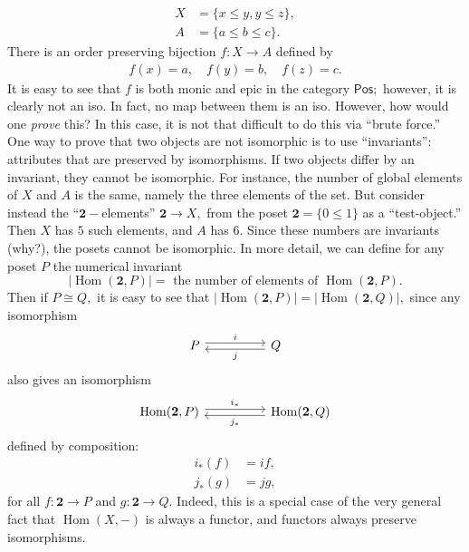 \documentclass[11pt,leqno,landscape,semhelv]{seminar}
\numberwithin{equation}{section}
\theoremstyle{definition}
\numberwithin{thm}{section}
\numberwithin{equation}{section}
\newcommand{\Hom}{\operatorname{Hom}}
\begin{document}
\begin{align*} 
	X &= \{x\le y, y\le z\},\\
	A &= \{a \le b \le c\}.
\end{align*}
There is an order preserving bijection $f:X \to A$ defined by
\begin{align*} 
	f(x) = a, \quad f(y) = b, \quad f(z) = c.
\end{align*}
It is easy to see that $f$ is both monic and epic in the category $\mathsf{Pos};$ however, it is clearly not an iso. In fact, no map between them is an iso. However, how would one \emph{prove} this? In this case, it is not that difficult to do this via ``brute force.''\\
One way to prove that two objects are not isomorphic is to use ``invariants'': attributes that are preserved by isomorphisms. If two objects differ by an invariant, they cannot be isomorphic. For instance, the number of global elements of $X$ and $A$ is the same, namely the three elements of the set. But consider instead the ``$\mathbf{2}-$elements'' $\mathbf{2} \to X,$ from the poset $\mathbf{2} = \{0 \le 1\}$ as a ``test-object.'' Then $X$ has $5$ such elements, and $A$ has $6.$ Since these numbers are invariants (why?), the posets cannot be isomorphic. In more detail, we can define for any poset $P$ the numerical invariant
\begin{equation*} 
	|\Hom(\mathbf{2}, P)| = \text{ the number of elements of }\Hom(\mathbf{2}, P).
\end{equation*}
Then if $P \cong Q,$ it is easy to see that $|\Hom(\mathbf{2}, P)| = |\Hom(\mathbf{2}, Q)|,$ since any isomorphism
\begin{equation*} 
	\begin{tikzcd}
		P \arrow[rr, "i", shift left = 1] && Q \arrow[ll, "j", shift left = 1]
	\end{tikzcd}
\end{equation*}
also gives an isomorphism
\begin{equation*} 
	\begin{tikzcd}
		\Hom(\mathbf{2}, P) \arrow[rr, "i_*", shift left = 1] && \Hom(\mathbf{2}, Q) \arrow[ll, "j_*", shift left = 1]
	\end{tikzcd}
\end{equation*}
defined by composition:
\begin{align*} 
	i_*(f) &= if,\\
	j_*(g) &= jg,
\end{align*}
for all $f:\mathbf{2} \to P$ and $g:\mathbf{2} \to Q.$ Indeed, this is a special case of the very general fact that $\Hom(X,- )$ is always a functor, and functors always preserve isomorphisms.
\end{document}
